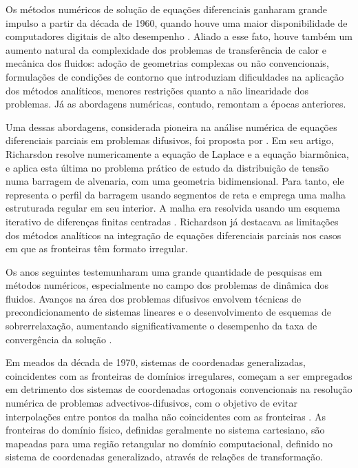 Os métodos numéricos de solução de equações diferenciais ganharam grande impulso a partir da década de 1960, quando houve uma maior disponibilidade
de computadores digitais de alto desempenho \citep{livro_tanehill}. Aliado a esse fato, houve também um aumento natural da complexidade dos problemas de transferência
de calor e mecânica dos fluidos: adoção de geometrias complexas ou não convencionais, formulações de condições de contorno que introduziam dificuldades na
aplicação dos métodos analíticos, menores restrições quanto a não linearidade dos problemas. Já as abordagens numéricas, contudo, remontam a épocas anteriores. 

Uma dessas abordagens, considerada pioneira na análise numérica de equações diferenciais parciais em problemas
difusivos, foi proposta por \cite{artigo_richardson}. Em seu artigo, Richarsdon resolve numericamente a equação de Laplace e a equação biarmônica, e aplica esta última no problema prático de estudo da distribuição de tensão numa
barragem de alvenaria, com uma geometria bidimensional. Para tanto, ele representa o perfil da barragem usando segmentos de reta e emprega uma malha estruturada regular em seu interior. A malha
era resolvida usando um esquema iterativo de diferenças finitas centradas \citep{livro_tanehill}. Richardson já destacava as limitações dos métodos analíticos na integração de equações diferenciais parciais nos casos em que as fronteiras têm formato irregular.

Os anos seguintes testemunharam uma grande quantidade de pesquisas em métodos numéricos, especialmente no campo dos problemas de dinâmica dos fluidos. Avanços na área dos
problemas difusivos envolvem técnicas de precondicionamento de sistemas lineares e o desenvolvimento de esquemas de sobrerrelaxação, aumentando significativamente
o desempenho da taxa de convergência da solução \citep{artigo_frankel, artigo_fedorenko}.

Em meados da década de 1970, sistemas de coordenadas generalizadas, coincidentes com as fronteiras de domínios irregulares,
começam a ser empregados em detrimento dos sistemas de coordenadas ortogonais convencionais na resolução numérica de problemas advectivos-difusivos,
com o objetivo de evitar interpolações entre pontos da malha não coincidentes com as fronteiras \citep{livro_maliska}. As fronteiras do domínio físico, definidas geralmente no sistema 
cartesiano, são mapeadas para uma região retangular no domínio computacional, definido no sistema de coordenadas generalizado, através de relações de transformação.

